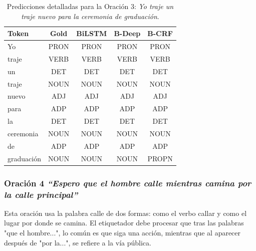 \documentclass[12pt, a4paper]{article}
\begin{document}
\begin{table}[H]
    \centering
    \caption{Predicciones detalladas para la Oración 3: \textit{Yo traje un traje nuevo para la ceremonia de graduación}.}
    \label{tab:inf3_vert}
    \begin{tabular}{lcccc}
        \toprule
        \textbf{Token} & \textbf{Gold} & \textbf{BiLSTM} & \textbf{B-Deep} & \textbf{B-CRF} \\
        \midrule
        Yo         & PRON & PRON & PRON & PRON \\
        traje      & VERB & VERB & VERB & VERB \\
        un         & DET  & DET & DET  & DET \\
        traje      & NOUN & NOUN & NOUN & NOUN \\
        nuevo      & ADJ  & ADJ & ADJ  & ADJ \\
        para       & ADP  & ADP & ADP  & ADP \\
        la         & DET  & DET & DET  & DET \\
        ceremonia  & NOUN & NOUN & NOUN & NOUN \\
        de         & ADP  & ADP & ADP  & ADP \\
        graduación & NOUN & NOUN & NOUN & PROPN \\
        \bottomrule
    \end{tabular}
\end{table}

\subsubsection{Oración 4 \textit{``Espero que el hombre calle mientras camina por la calle principal''}}

Esta oración usa la palabra calle de dos formas: como el verbo callar y como el lugar por donde se camina. El etiquetador debe procesar que tras las palabras "que el hombre...", lo común es que siga una acción, mientras que al aparecer después de "por la...", se refiere a la vía pública.
\end{document}
